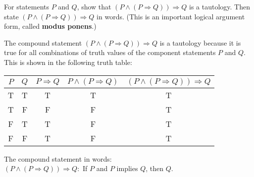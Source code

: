 \documentclass[12pt]{article}
\newenvironment{problem}[2][Problem]{\begin{trivlist}
		\item[\hskip \labelsep {\bfseries #1}\hskip \labelsep {\bfseries #2.}]}{\end{trivlist}}
\newenvironment{solution}[2][Solution]{\begin{trivlist}
		\item[\hskip \labelsep {\bfseries #1}\hskip \labelsep {\bfseries #2.}]}{\end{trivlist}}
\begin{document}
\begin{problem}{48}
	For statements $P$ and $Q$, show that $(P \wedge (P \Rightarrow Q)) \Rightarrow Q$ is a tautology. Then state $(P \wedge (P \Rightarrow Q)) \Rightarrow Q$ in words. (This is an important logical argument form, called \textbf{modus ponens}.)
	\begin{solution}{}
		The compound statement $(P \wedge (P \Rightarrow Q)) \Rightarrow Q$ is a tautology because it is true for all combinations of truth values of the component statements $P$ and $Q$. This is shown in the following truth table:
		 \begin{center}
		 	\begin{tabular}{c c c c c }
		 		$P$ & $Q$ & $P \Rightarrow Q$ & $P \wedge (P \Rightarrow Q)$ & $(P \wedge (P \Rightarrow Q)) \Rightarrow Q$ \\
		 		\hline
		 		T & T & T & T & T \\
		 		T & F & F & F& T\\
		 		F & T & T & F& T\\
		 		F & F & T & F& T\\
		 		\hline
		 		
		 	\end{tabular}
		 \end{center}
	 The compound statement in words:\\
	 $(P \wedge (P \Rightarrow Q)) \Rightarrow Q: $ If $P$ and $P$ implies $Q$, then $Q$.\\
	 

\end{solution}
\end{problem}
\end{document}

